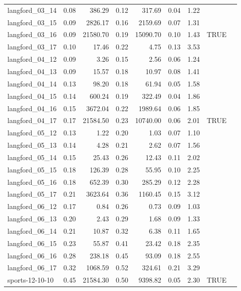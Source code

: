 \documentclass[runningheads]{llncs}
\begin{document}
\begin{table}[ht]
\begin{tabular}{lrrrrrrll}
 langford\_03\_14 & 0.08 & 386.29 & 0.12 & 317.69 & 0.04 & 1.22 &   &   \\ 
 langford\_03\_15 & 0.09 & 2826.17 & 0.16 & 2159.69 & 0.07 & 1.31 &   &   \\ 
 langford\_03\_16 & 0.09 & 21580.70 & 0.19 & 15090.70 & 0.10 & 1.43 & TRUE &   \\ 
 langford\_03\_17 & 0.10 & 17.46 & 0.22 & 4.75 & 0.13 & 3.53 &   &   \\ 
 langford\_04\_12 & 0.09 & 3.26 & 0.15 & 2.56 & 0.06 & 1.24 &   &   \\ 
 langford\_04\_13 & 0.09 & 15.57 & 0.18 & 10.97 & 0.08 & 1.41 &   &   \\ 
 langford\_04\_14 & 0.13 & 98.20 & 0.18 & 61.94 & 0.05 & 1.58 &   &   \\ 
 langford\_04\_15 & 0.14 & 600.24 & 0.19 & 322.49 & 0.04 & 1.86 &   &   \\ 
 langford\_04\_16 & 0.15 & 3672.04 & 0.22 & 1989.64 & 0.06 & 1.85 &   &   \\ 
 langford\_04\_17 & 0.17 & 21584.50 & 0.23 & 10740.00 & 0.06 & 2.01 & TRUE &   \\ 
 langford\_05\_12 & 0.13 & 1.22 & 0.20 & 1.03 & 0.07 & 1.10 &   &   \\ 
 langford\_05\_13 & 0.14 & 4.28 & 0.21 & 2.62 & 0.07 & 1.56 &   &   \\ 
 langford\_05\_14 & 0.15 & 25.43 & 0.26 & 12.43 & 0.11 & 2.02 &   &   \\ 
 langford\_05\_15 & 0.18 & 126.39 & 0.28 & 55.95 & 0.10 & 2.25 &   &   \\ 
 langford\_05\_16 & 0.18 & 652.39 & 0.30 & 285.29 & 0.12 & 2.28 &   &   \\ 
 langford\_05\_17 & 0.21 & 3623.64 & 0.36 & 1160.45 & 0.15 & 3.12 &   &   \\ 
 langford\_06\_12 & 0.17 & 0.84 & 0.26 & 0.73 & 0.09 & 1.03 &   &   \\ 
 langford\_06\_13 & 0.20 & 2.43 & 0.29 & 1.68 & 0.09 & 1.33 &   &   \\ 
 langford\_06\_14 & 0.21 & 10.87 & 0.32 & 6.38 & 0.11 & 1.65 &   &   \\ 
 langford\_06\_15 & 0.23 & 55.87 & 0.41 & 23.42 & 0.18 & 2.35 &   &   \\ 
 langford\_06\_16 & 0.28 & 238.18 & 0.45 & 93.09 & 0.18 & 2.55 &   &   \\ 
 langford\_06\_17 & 0.32 & 1068.59 & 0.52 & 324.61 & 0.21 & 3.29 &   &   \\ 
 sports-12-10-10 & 0.45 & 21584.30 & 0.50 & 9398.82 & 0.05 & 2.30 & TRUE &   \\ 

\end{tabular}
\end{table}
\end{document}
